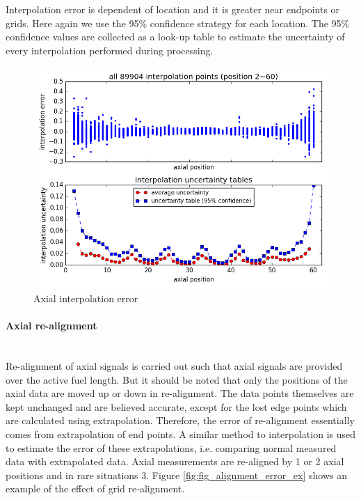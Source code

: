 \documentclass{article}
\begin{document}
Interpolation error is dependent of location and it is greater near endpoints or grids. Here again we use the 95\% confidence strategy for each location. The 95\% confidence values are collected as a look-up table to estimate the uncertainty of every interpolation performed during processing.

\begin{figure}[ht]
\centering
\includegraphics[keepaspectratio, width = 4.0 in]{figures/flux_map_uncertainties/interp_error.png}
\caption{Axial interpolation error}
\label{fig:fig_interp_error}
\end{figure}

\paragraph{Axial re-alignment}
\mbox{ }\\
Re-alignment of axial signals is carried out such that axial signals are provided over the active fuel length. But it should be noted that only the positions of the axial data are moved up or down in re-alignment. The data points themselves are kept unchanged and are believed accurate, except for the lost edge points which are calculated using extrapolation. Therefore, the error of re-alignment essentially comes from extrapolation of end points. A similar method to interpolation is used to estimate the error of these extrapolations, i.e. comparing normal measured data with extrapolated data. Axial measurements are re-aligned by 1 or 2 axial positions and in rare situations 3. Figure \ref{fig:fig_alignment_error_ex} shows an example of the effect of grid re-alignment.
\end{document}

